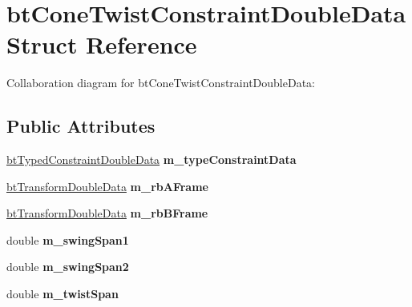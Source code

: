 \hypertarget{structbt_cone_twist_constraint_double_data}{\section{bt\+Cone\+Twist\+Constraint\+Double\+Data Struct Reference}
\label{structbt_cone_twist_constraint_double_data}
}


Collaboration diagram for bt\+Cone\+Twist\+Constraint\+Double\+Data\+:
\subsection*{Public Attributes}
\begin{DoxyCompactItemize}
\item 
\hypertarget{structbt_cone_twist_constraint_double_data_a2c025cafc78fb0957b574c553beb7107}{\hyperlink{structbt_typed_constraint_double_data}{bt\+Typed\+Constraint\+Double\+Data} {\bfseries m\+\_\+type\+Constraint\+Data}}\label{structbt_cone_twist_constraint_double_data_a2c025cafc78fb0957b574c553beb7107}

\item 
\hypertarget{structbt_cone_twist_constraint_double_data_af26ee70fc95b5c1fa6915b87f207db70}{\hyperlink{structbt_transform_double_data}{bt\+Transform\+Double\+Data} {\bfseries m\+\_\+rb\+A\+Frame}}\label{structbt_cone_twist_constraint_double_data_af26ee70fc95b5c1fa6915b87f207db70}

\item 
\hypertarget{structbt_cone_twist_constraint_double_data_ab6118fb912908c31d7049f2ff32eed24}{\hyperlink{structbt_transform_double_data}{bt\+Transform\+Double\+Data} {\bfseries m\+\_\+rb\+B\+Frame}}\label{structbt_cone_twist_constraint_double_data_ab6118fb912908c31d7049f2ff32eed24}

\item 
\hypertarget{structbt_cone_twist_constraint_double_data_ae3409769b377340aee5f1ce2ee4400f0}{double {\bfseries m\+\_\+swing\+Span1}}\label{structbt_cone_twist_constraint_double_data_ae3409769b377340aee5f1ce2ee4400f0}

\item 
\hypertarget{structbt_cone_twist_constraint_double_data_aab156c2780767d200f39fd13dddef94b}{double {\bfseries m\+\_\+swing\+Span2}}\label{structbt_cone_twist_constraint_double_data_aab156c2780767d200f39fd13dddef94b}

\item 
\hypertarget{structbt_cone_twist_constraint_double_data_ac388d94e593b005798fd982f0b1ed553}{double {\bfseries m\+\_\+twist\+Span}}\label{structbt_cone_twist_constraint_double_data_ac388d94e593b005798fd982f0b1ed553}


\end{DoxyCompactItemize}
